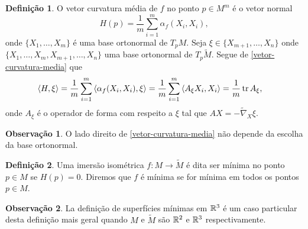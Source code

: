 \documentclass[10pt,a4paper]{beamer}
\theoremstyle{definition}
\newtheorem{definicao}{Definição}
\newtheorem{observacao}{Observação}
\begin{document}
\begin{frame}

	\begin{definicao}
		O \alert{vetor curvatura média} de $f$ no ponto $p \in M^m$ é o vetor normal
		\begin{equation}\label{vetor-curvatura-media}
		H(p) = \frac{1}{m} \sum_{i=1}^m \alpha_f(X_i,X_i),
		\end{equation}
		onde $\{X_1, \ldots, X_m \}$ é uma base ortonormal de $T_p M$. 
		Seja $\xi \in \{ X_{m+1}, \ldots, X_n \}$ onde
		$\{ X_1, \ldots, X_m, X_{m+1}, \ldots, X_n \}$ uma base ortonormal de $T_p \tilde{M}$.
		Segue de \eqref{vetor-curvatura-media} que
		\begin{align*}
		\left\langle H,\xi \right\rangle &= \frac{1}{m} \sum_{i=1}^m \left\langle \alpha_f(X_i,X_i),\xi \right\rangle = \frac{1}{m} \sum_{i=1}^m \left\langle A_{\xi} X_i,X_i \right\rangle = \frac{1}{m} \operatorname{tr} A_{\xi},
		\end{align*}
		onde $A_{\xi}$ é o \alert{operador de forma} com respeito a $\xi$ tal que $AX = -\tilde{\nabla}_X \xi$.

	\end{definicao}

\end{frame}

\begin{frame}
	
	\begin{observacao}
		O lado direito de \eqref{vetor-curvatura-media} não depende da escolha da base ortonormal.
	\end{observacao}
	
	\pause

	\begin{definicao}
		Uma imersão isométrica $f: M \rightarrow \tilde{M}$ é dita ser \alert{mínima} no ponto $p \in M$ se $H(p)=0$. Diremos que $f$ é \alert{mínima} se for mínima em todos os pontos $p \in M$.
	\end{definicao}

	\pause

	\begin{observacao}
		La definição de superfícies mínimas em $\mathbb R^3$ é \alert{um caso particular} desta definição mais geral quando $M$ e $\tilde{M}$ são $\mathbb R^2$ e $\mathbb R^3$ respectivamente.
	\end{observacao}
\end{frame}
\end{document}
